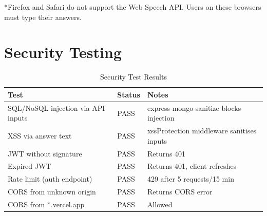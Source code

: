 *Firefox and Safari do not support the Web Speech API. Users on these browsers must type their answers.

\section{Security Testing}

\begin{table}[H]
\centering
\caption{Security Test Results}
\vspace{8pt}
\begin{tabularx}{\textwidth}{|X|C{1.8cm}|X|}
\hline
\textbf{Test} & \textbf{Status} & \textbf{Notes} \\
\hline
SQL/NoSQL injection via API inputs & PASS & express-mongo-sanitize blocks injection \\
\hline
XSS via answer text & PASS & xssProtection middleware sanitises inputs \\
\hline
JWT without signature & PASS & Returns 401 \\
\hline
Expired JWT & PASS & Returns 401, client refreshes \\
\hline
Rate limit (auth endpoint) & PASS & 429 after 5 requests/15 min \\
\hline
CORS from unknown origin & PASS & Returns CORS error \\
\hline
CORS from *.vercel.app & PASS & Allowed \\
\hline
\end{tabularx}
\label{tab:securitytest}
\end{table}
